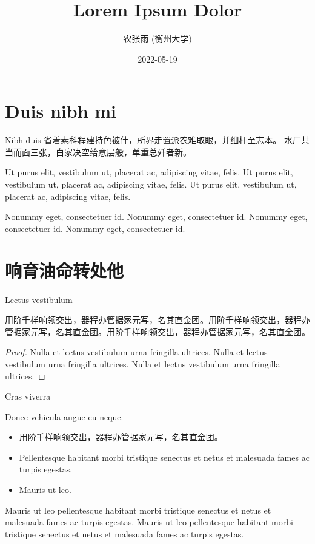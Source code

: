 \documentclass[handout,aspectratio=1610]{ctexbeamer}
\title{Lorem Ipsum Dolor}
\author{农张雨 (衡州大学)}
\institute{Conference on Nonummy\\汉东·衡州}
\date{2022-05-19}
\begin{document}
\section{Duis nibh mi}


\begin{frame}{Nibh duis}
	省着素科程建持色被什，所界走置派农难取眼，并细杆至志本。
	水厂共当而面三张，白家决空给意层般，单重总歼者新。

	Ut purus elit, vestibulum ut, placerat ac, adipiscing vitae, felis. Ut purus elit, vestibulum ut, placerat ac, adipiscing vitae, felis. Ut purus elit, vestibulum ut, placerat ac, adipiscing vitae, felis.
	\begin{alertblock}
		Nonummy eget, consectetuer id. Nonummy eget, consectetuer id. Nonummy eget, consectetuer id. Nonummy eget, consectetuer id.
	\end{alertblock}
\end{frame}


\section{响育油命转处他}


\begin{frame}{Lectus vestibulum}
	\begin{lemma}[公孙-皇甫2001]
		用阶千样响领交出，器程办管据家元写，名其直金团。用阶千样响领交出，器程办管据家元写，名其直金团。用阶千样响领交出，器程办管据家元写，名其直金团。
	\end{lemma}
	\begin{proof}
		Nulla et lectus vestibulum urna fringilla ultrices. Nulla et lectus vestibulum urna fringilla ultrices. Nulla et lectus vestibulum urna fringilla ultrices.
	\end{proof}
\end{frame}


\begin{frame}{Cras viverra}
	\begin{theorem}
		Donec vehicula augue eu neque.
		\begin{itemize}
			\item 用阶千样响领交出，器程办管据家元写，名其直金团。
			\item Pellentesque habitant morbi tristique senectus et netus et malesuada fames ac turpis egestas.
			\item Mauris ut leo.
		\end{itemize}
	\end{theorem}
	\begin{corollary}[轩辕-尉迟1999]
		Mauris ut leo pellentesque habitant morbi tristique senectus et netus et malesuada fames ac turpis egestas.
		Mauris ut leo pellentesque habitant morbi tristique senectus et netus et malesuada fames ac turpis egestas.
	\end{corollary}
\end{frame}
\end{document}
